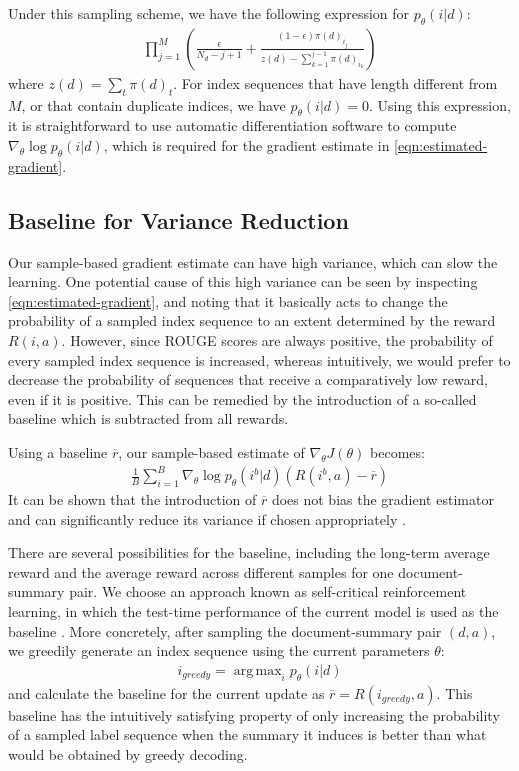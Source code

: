 \documentclass[11pt,a4paper]{article}
\DeclareMathOperator*{\argmax}{arg\,max}
\begin{document}
Under this sampling scheme, we have the following expression for $p_\theta(i|d)$:
\begin{align}
\prod_{j=1}^M \left( \frac{\epsilon}{N_d - j + 1} + \frac{(1-\epsilon)\pi(d)_{i_j}}{z(d) - \sum_{k=1}^{j-1} \pi(d)_{i_k}} \right)
\end{align}
where $z(d) = \sum_t\pi(d)_t$. For index sequences that have length different from $M$, or that contain duplicate indices, we have $p_\theta(i|d) = 0$. Using this expression, it is straightforward to use automatic differentiation software to compute $\nabla_\theta \log p_\theta(i|d)$, which is required for the gradient estimate in \eqref{eqn:estimated-gradient}.

\subsection{Baseline for Variance Reduction} \label{subsec:baseline}
Our sample-based gradient estimate can have high variance, which can slow the learning. One potential cause of this high variance can be seen by inspecting \eqref{eqn:estimated-gradient}, and noting that it basically acts to change the probability of a sampled index sequence to an extent determined by the reward $R(i, a)$. However, since ROUGE scores are always positive, the probability of every sampled index sequence is increased, whereas intuitively, we would prefer to decrease the probability of sequences that receive a comparatively low reward, even if it is positive. This can be remedied by the introduction of a so-called baseline which is subtracted from all rewards.

Using a baseline $\overline{r}$, our sample-based estimate of $\nabla_\theta J(\theta)$ becomes:
\begin{align}
    \frac{1}{B} \sum_{i=1}^{B}\nabla_\theta \log p_\theta(i^b | d) (R(i^b, a) - \overline{r})\label{eqn:estimated-gradient-baseline}
\end{align}
It can be shown that the introduction of $\overline{r}$ does not bias the gradient estimator and can significantly reduce its variance if chosen appropriately \citep{sutton2000policy}. 

There are several possibilities for the baseline, including the long-term average reward and the average reward across different samples for one document-summary pair. We choose an approach known as self-critical reinforcement learning, in which the test-time performance of the current model is used as the baseline \citep{Ranzato2015SequenceLT,rennie2017self,abs5_paulus2017deep}. More concretely, after sampling the document-summary pair $(d, a)$, we greedily generate an index sequence using the current parameters $\theta$:
\begin{align}
    i_\textit{greedy} = \argmax_i p_\theta(i | d)
\end{align}
and calculate the baseline for the current update as $\overline{r} = R(i_\textit{greedy}, a)$. This baseline has the intuitively satisfying property of only increasing the probability of a sampled label sequence when the summary it induces is better than what would be obtained by greedy decoding. 
\end{document}

